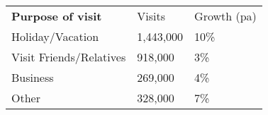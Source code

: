 \begin{tabular}[t]{p{4.7cm}>{\hfill}p{1.1cm}>{\hfill}p{1.7cm}}
 \textbf{Purpose of visit} & Visits & Growth (pa) \\ 
 Holiday/Vacation & 1,443,000 & 10\% \\ 
  Visit Friends/Relatives &   918,000 & 3\% \\ 
  Business &   269,000 & 4\% \\ 
  Other & 328,000 & 7\% \\ 
  \end{tabular}
